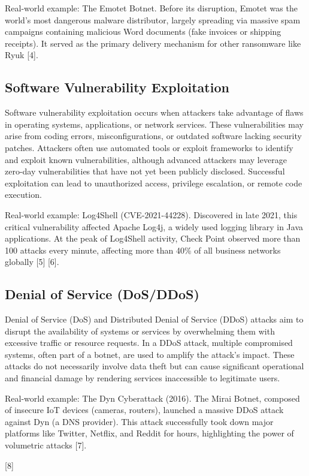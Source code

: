 Real-world example: The Emotet Botnet. Before its disruption, Emotet was the world's most dangerous malware distributor, largely spreading via massive spam campaigns containing malicious Word documents (fake invoices or shipping receipts). It served as the primary delivery mechanism for other ransomware like Ryuk [4].

\subsection{Software Vulnerability Exploitation}

Software vulnerability exploitation occurs when attackers take advantage of flaws in operating systems, applications, or network services. These vulnerabilities may arise from coding errors, misconfigurations, or outdated software lacking security patches. Attackers often use automated tools or exploit frameworks to identify and exploit known vulnerabilities, although advanced attackers may leverage zero-day vulnerabilities that have not yet been publicly disclosed. Successful exploitation can lead to unauthorized access, privilege escalation, or remote code execution.

Real-world example: Log4Shell (CVE-2021-44228). Discovered in late 2021, this critical vulnerability affected Apache Log4j, a widely used logging library in Java applications. At the peak of Log4Shell activity, Check Point observed more than 100 attacks every minute, affecting more than 40\% of all business networks globally [5] [6].

\subsection{Denial of Service (DoS/DDoS)}

Denial of Service (DoS) and Distributed Denial of Service (DDoS) attacks aim to disrupt the availability of systems or services by overwhelming them with excessive traffic or resource requests. In a DDoS attack, multiple compromised systems, often part of a botnet, are used to amplify the attack's impact. These attacks do not necessarily involve data theft but can cause significant operational and financial damage by rendering services inaccessible to legitimate users.

Real-world example: The Dyn Cyberattack (2016). The Mirai Botnet, composed of insecure IoT devices (cameras, routers), launched a massive DDoS attack against Dyn (a DNS provider). This attack successfully took down major platforms like Twitter, Netflix, and Reddit for hours, highlighting the power of volumetric attacks [7].

[8]
